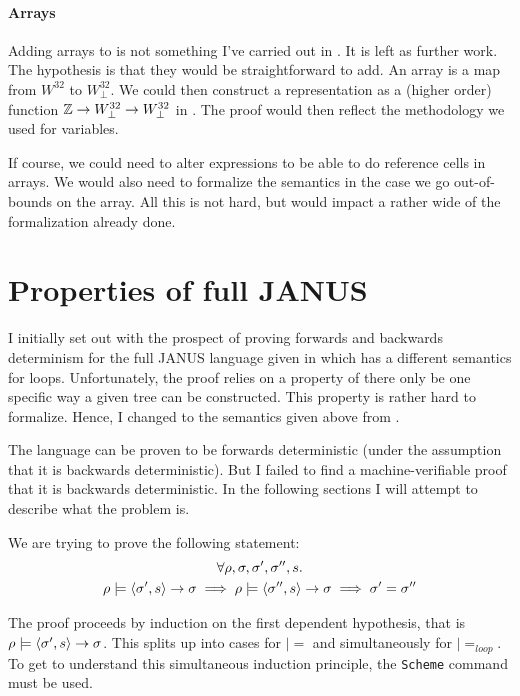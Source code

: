 \paragraph{Arrays}

Adding arrays to \januso{} is not something I've carried out in
\coq{}. It is left as further work. The hypothesis is that they would
be straightforward to add. An array is a map from $W^{32}$ to
$W^{32}_{\perp}$. We could then construct a representation as a
(higher order) function $\mathbb{Z} \to W^{32}_{\perp} \to W^{32}_{\perp}$ in
\coq{}. The proof would then reflect the methodology we used for
variables.

If course, we could need to alter expressions to be able to do
reference cells in arrays. We would also need to formalize the
semantics in the case we go out-of-bounds on the array. All this is
not hard, but would impact a rather wide of the formalization already
done.

\section{Properties of full JANUS}
\label{sec:prop-full-janus}

I initially set out with the prospect of proving forwards and
backwards determinism for the full JANUS language given in
\cite{glueck+2007} which has a different semantics for
loops. Unfortunately, the proof relies on a property of there only be
one specific way a given tree can be constructed. This property is
rather hard to formalize. Hence, I changed to the semantics given
above from \cite{glueck+2008}.

The language can be proven to be forwards deterministic (under the
assumption that it is backwards deterministic). But I failed to find a
machine-verifiable proof that it is backwards deterministic. In the
following sections I will attempt to describe what the problem is.

We are trying to prove the following statement:
\begin{multline*}
  \forall \rho, \sigma, \sigma', \sigma'', s . \\
  \rho |= \langle \sigma', s \rangle -> \sigma \implies \rho |=
  \langle \sigma'', s \rangle -> \sigma \implies \sigma' = \sigma''
\end{multline*}

The proof proceeds by induction on the first dependent hypothesis,
that is $\rho |= \langle \sigma', s \rangle -> \sigma$. This splits up into
cases for $|=$ and simultaneously for $|=_{loop}$. To get \coq{} to
understand this simultaneous induction principle, the \texttt{Scheme}
command must be used.

